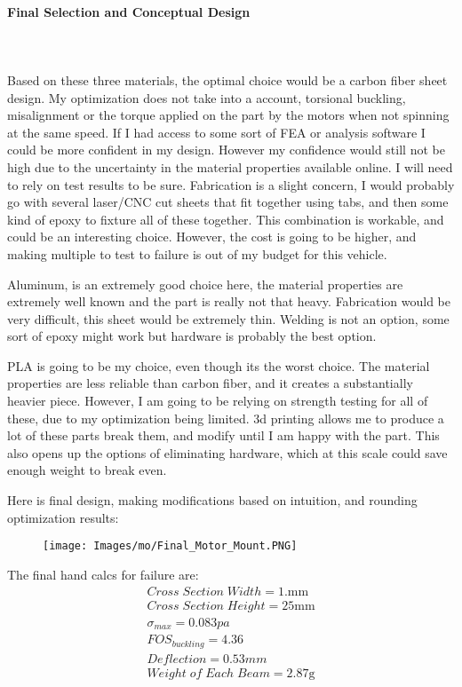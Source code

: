 \documentclass[12pt,letterpaper]{article}
\begin{document}
\paragraph{Final Selection and Conceptual Design}
\setcounter{tocdepth}{4}
\setcounter{secnumdepth}{4}
\mbox{}\\\\
Based on these three materials, the optimal choice would be a carbon fiber sheet design. My optimization does not take into a account, torsional buckling, misalignment or the torque applied on the part by the motors when not spinning at the same speed. If I had access to some sort of FEA or analysis software I could be more confident in my design. However my confidence would still  not be high due to the uncertainty in the material properties available online. I will need to rely on test results to be sure. Fabrication is a slight concern, I would probably go with several laser/CNC cut sheets that fit together using tabs, and then some kind of epoxy to fixture all of these together. This combination is workable, and could be an interesting choice. However, the cost is going to be higher, and making multiple to test to failure is out of my budget for this vehicle.

Aluminum, is an extremely good choice here, the material properties are extremely well known and the part is really not that heavy. Fabrication would be very difficult, this sheet would be extremely thin. Welding is not an option, some sort of epoxy might work but hardware is probably the best option. 

PLA is going to be my choice, even though its the worst choice. The material properties are less reliable than carbon fiber, and it creates a substantially heavier piece. However, I am going to be relying on strength testing for all of these, due to my optimization being limited. 3d printing allows me to produce a lot of these parts break them, and modify until I am happy with the part. This also opens up the options of eliminating hardware, which at this scale could save enough weight to break even.

\pagebreak
Here is final design, making modifications based on intuition, and rounding optimization results: 
\begin{figure}[h]
    \centering
    \texttt{[image: Images/mo/Final\_Motor\_Mount.PNG]}
    \caption{}
    \label{fig:my_label}
\end{figure}

The final hand calcs for failure are:
\begin{gather*}
Cross\;Section\;Width = 1.\unit{\mm}\\
Cross\;Section\;Height = 25\unit{\mm}\\
\sigma_{max} = 0.083\unit{pa}\\
FOS_{buckling} = 4.36\\
Deflection = 0.53\unit{mm}\\
Weight\;of\;Each\;Beam = 2.87\unit{\g}
\end{gather*}
\end{document}
